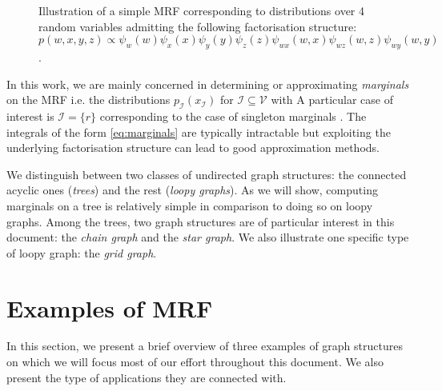 \begin{figure}[!h]
\center
{}
\caption{\label{fig:simple-MRF}Illustration of a simple MRF corresponding to distributions over 4 random variables admitting the following factorisation structure:\\ $p(w,x,y,z)\propto \psi_{w}(w)\psi_{x}(x)\psi_{y}(y)\psi_{z}(z)\psi_{wx}(w,x)\psi_{wz}(w,z)\psi_{wy}(w,y)$.}
\end{figure}
In this work, we are mainly concerned in determining or approximating  \emph{marginals} on the MRF i.e. the distributions $p_{\mathcal I}(x_{\mathcal I})$ for $\mathcal I\subseteq\mathcal V$  with
A particular case of interest is $\mathcal I=\{r\}$ corresponding to the case of singleton marginals \citep[section 2.3]{wainwright08}. The integrals of the form \eqref{eq:marginals} are typically intractable but exploiting the underlying factorisation structure can lead to good approximation methods.

We distinguish between two classes of undirected graph structures: the connected acyclic ones (\emph{trees}) and the rest (\emph{loopy graphs}). As we will show, computing marginals on a tree is relatively simple in comparison to doing so on loopy graphs. 
Among the trees, two graph structures are of particular interest in this document: the \emph{chain graph} and the \emph{star graph}. 
We also illustrate one specific type of loopy graph: the \emph{grid graph}.


\section{\label{intro:exMRF}Examples of MRF}
In this section, we present a brief overview of three examples of graph structures on which we will focus most of our effort throughout this document. 
We also present the type of applications they are connected with. 


